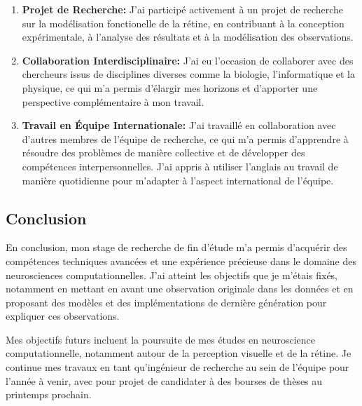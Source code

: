 \begin{enumerate}
      \item \textbf{Projet de Recherche:} J'ai participé activement à un
            projet
            de recherche sur la modélisation fonctionelle de la rétine, en
            contribuant à la conception
            expérimentale, à l'analyse des résultats et
            à la modélisation des observations.

      \item \textbf{Collaboration Interdisciplinaire:} J'ai eu l'occasion de
            collaborer avec des chercheurs issus de disciplines diverses comme
            la biologie, l'informatique et la physique, ce qui
            m'a permis
            d'élargir mes horizons et d'apporter une perspective complémentaire
            à mon travail.

      \item \textbf{Travail en Équipe Internationale:} J'ai travaillé en
            collaboration
            avec d'autres membres de l'équipe de recherche, ce qui m'a permis
            d'apprendre à
            résoudre des problèmes de manière collective et de développer des
            compétences interpersonnelles. J'ai appris à utiliser l'anglais au
            travail de manière quotidienne pour m'adapter à l'aspect
            international de l'équipe.
\end{enumerate}

\subsection{Conclusion}

En conclusion, mon stage de recherche de fin d'étude m'a
permis d'acquérir des compétences techniques avancées et une expérience
précieuse dans le domaine des neurosciences computationnelles.
J'ai atteint les objectifs que je m'étais fixés,
notamment en mettant en avant une observation originale dans les données et en
proposant des modèles et des implémentations de dernière génération pour
expliquer ces observations.

Mes objectifs futurs incluent la poursuite de mes études en neuroscience
computationnelle, notamment autour de la perception visuelle et de la rétine.
Je continue mes travaux en tant qu'ingénieur de recherche au sein de l'équipe
pour l'année à venir, avec pour projet de candidater à des bourses de thèses au
printemps prochain.